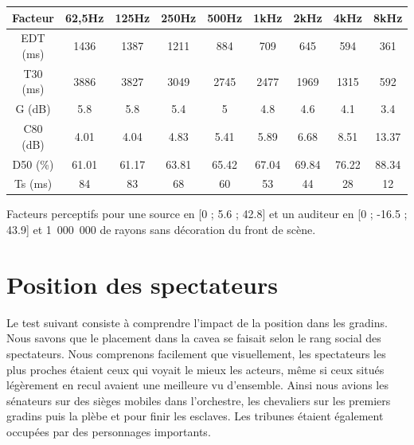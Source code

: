 \begin{tableth} 
 \begin{tabular}{| *{9}{c|}} 
 \hline 
 Facteur & 62,5Hz & 125Hz & 250Hz & 500Hz & 1kHz & 2kHz & 4kHz & 8kHz \\ 
 \hline 
 \hline 
\gls{EDT} (ms)& 1436& 1387& 1211& 884& 709& 645& 594& 361 \\ 
 \hline 
\gls{T30} (ms)& 3886& 3827& 3049& 2745& 2477& 1969& 1315& 592 \\ 
 \hline 
\gls{G} (dB)& 5.8& 5.8& 5.4& 5& 4.8& 4.6& 4.1& 3.4 \\ 
 \hline 
\gls{C80} (dB)& 4.01& 4.04& 4.83& 5.41& 5.89& 6.68& 8.51& 13.37 \\ 
 \hline 
\gls{D50} (\%)& 61.01& 61.17& 63.81& 65.42& 67.04& 69.84& 76.22& 88.34 \\ 
 \hline 
\gls{Ts} (ms)& 84& 83& 68& 60& 53& 44& 28& 12 \\ 
 \hline 
\end{tabular} 
 \caption{Facteurs perceptifs pour une source en [0 ; 5.6 ; 42.8] et un auditeur en [0 ; -16.5 ; 43.9] et 1~000~000 de rayons sans décoration du front de scène.} 
 \label{tab_fact_sansdec} 
 \end{tableth}


\section{Position des spectateurs}
Le test suivant consiste à comprendre l'impact de la position dans les gradins. Nous savons que le placement dans la \gls{cavea} se faisait selon le rang social des spectateurs. Nous comprenons facilement que visuellement, les spectateurs les plus proches étaient ceux qui voyait le mieux les acteurs, même si ceux situés légèrement en recul avaient une meilleure vu d'ensemble. Ainsi nous avions les sénateurs sur des sièges mobiles dans l'orchestre, les chevaliers sur les premiers gradins puis la plèbe et pour finir les esclaves. Les tribunes étaient également occupées par des personnages importants.

